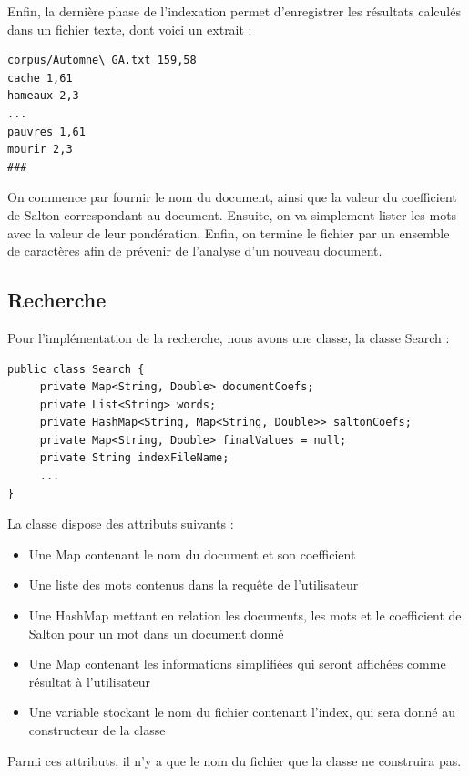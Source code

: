 \documentclass{article}
\begin{document}
Enfin, la dernière phase de l'indexation permet d'enregistrer les résultats calculés dans un
fichier texte, dont voici un extrait :

\begin{lstlisting}
corpus/Automne\_GA.txt 159,58
cache 1,61
hameaux 2,3
...
pauvres 1,61
mourir 2,3
###
\end{lstlisting}

On commence par fournir le nom du document, ainsi que la valeur du coefficient de Salton
correspondant au document. Ensuite, on va simplement lister les mots avec la valeur de leur
pondération. Enfin, on termine le fichier par un ensemble de caractères afin de prévenir de
l'analyse d'un nouveau document.

\subsection{Recherche}

Pour l'implémentation de la recherche, nous avons une classe, la classe Search :

\begin{lstlisting}
public class Search {
     private Map<String, Double> documentCoefs;
     private List<String> words;
     private HashMap<String, Map<String, Double>> saltonCoefs;
     private Map<String, Double> finalValues = null;
     private String indexFileName;
     ...
}
\end{lstlisting}

La classe dispose des attributs suivants :
\begin{itemize}
  \item Une Map contenant le nom du document et son coefficient 
  \item Une liste des mots contenus dans la requête de l'utilisateur 
  \item Une HashMap mettant en relation les documents, les mots et le coefficient de Salton pour un mot dans un document donné
  \item Une Map contenant les informations simplifiées qui seront affichées comme résultat à l'utilisateur
  \item Une variable stockant le nom du fichier contenant l'index, qui sera donné au constructeur de la classe
\end{itemize}
Parmi ces attributs, il n'y a que le nom du fichier que la classe ne construira pas.\\
\end{document}

